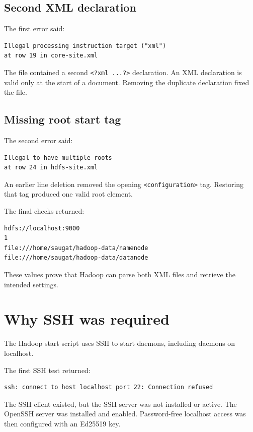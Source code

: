 \documentclass[11pt,a4paper]{article}
\begin{document}
\subsection{Second XML declaration}

The first error said:

\begin{lstlisting}
Illegal processing instruction target ("xml")
at row 19 in core-site.xml
\end{lstlisting}

The file contained a second \texttt{<?xml ...?>} declaration. An XML declaration is valid only at the start of a document. Removing the duplicate declaration fixed the file.

\subsection{Missing root start tag}

The second error said:

\begin{lstlisting}
Illegal to have multiple roots
at row 24 in hdfs-site.xml
\end{lstlisting}

An earlier line deletion removed the opening \texttt{<configuration>} tag. Restoring that tag produced one valid root element.

The final checks returned:

\begin{lstlisting}
hdfs://localhost:9000
1
file:///home/saugat/hadoop-data/namenode
file:///home/saugat/hadoop-data/datanode
\end{lstlisting}

These values prove that Hadoop can parse both XML files and retrieve the intended settings.

\section{Why SSH was required}

The Hadoop start script uses SSH to start daemons, including daemons on localhost.

The first SSH test returned:

\begin{lstlisting}
ssh: connect to host localhost port 22: Connection refused
\end{lstlisting}

The SSH client existed, but the SSH server was not installed or active. The OpenSSH server was installed and enabled. Password-free localhost access was then configured with an Ed25519 key.
\end{document}

